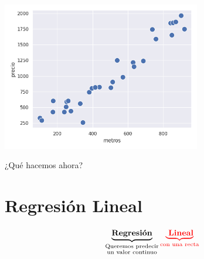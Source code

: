 \documentclass[aspectratio=169, usenames,dvipsnames]{beamer}
\begin{document}
\begin{frame}
\end{frame}

\begin{frame}
    \centering\includegraphics[width=0.65\textwidth]{img/regresion_ej_03.png}

    ¿Qué hacemos ahora?
\end{frame}

\section{Regresión Lineal}

\begin{frame}
    \huge
    \[\underbrace{\text{\textbf{Regresión}}}_{\substack{\text{Queremos predecir} \\ \text{un valor continuo}}} {\color{red}\underbrace{\text{ \textbf{Lineal}}}_{\text{con una recta}}}\]
\end{frame}
\end{document}
